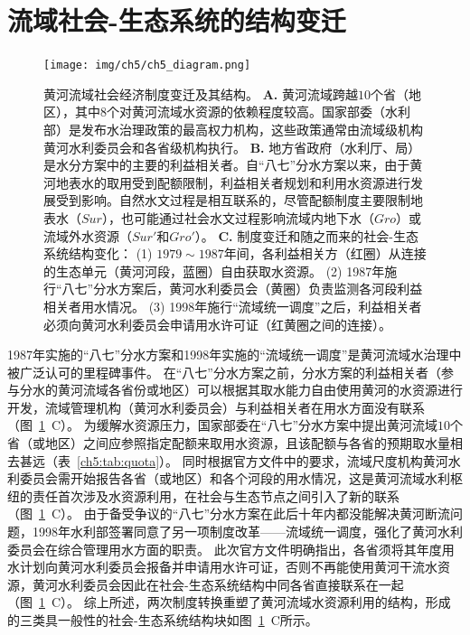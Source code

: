 
\section{流域社会-生态系统的结构变迁}\label{results-1}

\begin{figure}[!t]
	\texttt{[image: img/ch5/ch5\_diagram.png]}
	\caption[黄河流域社会经济制度变迁及其结构]{
		黄河流域社会经济制度变迁及其结构。
		\textbf{A.} 黄河流域跨越$10$个省（地区），其中$8$个对黄河流域水资源的依赖程度较高。国家部委（水利部）是发布水治理政策的最高权力机构，这些政策通常由流域级机构黄河水利委员会和各省级机构执行。
		\textbf{B.} 地方省政府（水利厅、局）是水分方案中的主要的利益相关者。自“八七”分水方案以来，由于黄河地表水的取用受到配额限制，利益相关者规划和利用水资源进行发展受到影响。自然水文过程是相互联系的，尽管配额制度主要限制地表水（$Sur$），也可能通过社会水文过程影响流域内地下水（$Gro$）或流域外水资源（$Sur'$和$Gro'$）。
		\textbf{C.} 制度变迁和随之而来的社会-生态系统结构变化：
		(1) $1979 \sim 1987$年间，各利益相关方（红圈）从连接的生态单元（黄河河段，蓝圈）自由获取水资源。
		(2) 1987年施行“八七”分水方案后，黄河水利委员会（黄圈）负责监测各河段利益相关者用水情况。
		(3) 1998年施行“流域统一调度”之后，利益相关者必须向黄河水利委员会申请用水许可证（红黄圈之间的连接）。}\label{fig:structure}
\end{figure}

1987年实施的“八七”分水方案和1998年实施的“流域统一调度”是黄河流域水治理中被广泛认可的里程碑事件。
在“八七”分水方案之前，分水方案的利益相关者（参与分水的黄河流域各省份或地区）可以根据其取水能力自由使用黄河的水资源进行开发，流域管理机构（黄河水利委员会）与利益相关者在用水方面没有联系（图~\ref{fig:structure}~C）。
为缓解水资源压力，国家部委在“八七”分水方案中提出黄河流域$10$个省（或地区）之间应参照指定配额来取用水资源，且该配额与各省的预期取水量相去甚远（表~\ref{ch5:tab:quota}）。
同时根据官方文件中的要求，流域尺度机构黄河水利委员会需开始报告各省（或地区）和各个河段的用水情况，这是黄河流域水利枢纽的责任首次涉及水资源利用，在社会与生态节点之间引入了新的联系（图~\ref{fig:structure}~C）。
由于备受争议的“八七”分水方案在此后十年内都没能解决黄河断流问题，1998年水利部签署同意了另一项制度改革——流域统一调度，强化了黄河水利委员会在综合管理用水方面的职责。
此次官方文件明确指出，各省须将其年度用水计划向黄河水利委员会报备并申请用水许可证，否则不再能使用黄河干流水资源，黄河水利委员会因此在社会-生态系统结构中同各省直接联系在一起（图~\ref{fig:structure}~C）。
综上所述，两次制度转换重塑了黄河流域水资源利用的结构，形成的三类具一般性的社会-生态系统结构块如图~\ref{fig:structure}~C所示。

